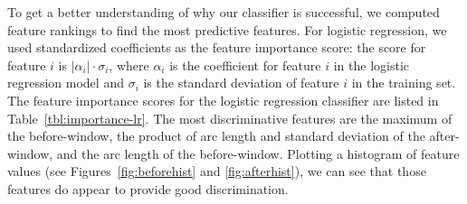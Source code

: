 


To get a better understanding of why our classifier is successful,
we computed feature rankings to find the most predictive features.
For logistic regression, we used standardized coefficients as the feature importance score:
the score for feature $i$ is $|\alpha_i| \cdot \sigma_i$, where $\alpha_i$ is the coefficient for feature $i$ in the logistic regression model and $\sigma_i$ is the standard deviation of feature $i$ in the training set.
The feature importance scores for the logistic regression classifier are listed in Table~\ref{tbl:importance-lr}.
The most discriminative features are
the maximum of the before-window,
the product of arc length and standard deviation of the after-window,
and the arc length of the before-window.
Plotting a histogram of feature values (see Figures~\ref{fig:beforehist} and \ref{fig:afterhist}), we can see that those features do appear to provide good discrimination.


